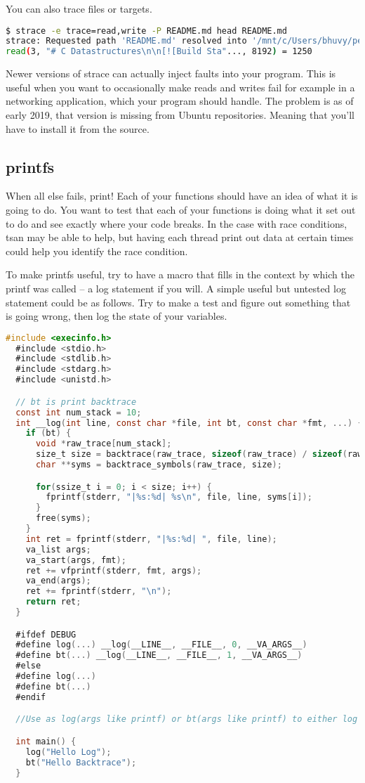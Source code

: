You can also trace files or targets.

\begin{lstlisting}[language=bash]
$ strace -e trace=read,write -P README.md head README.md
strace: Requested path 'README.md' resolved into '/mnt/c/Users/bhuvy/personal/libds/README.md'
read(3, "# C Datastructures\n\n[![Build Sta"..., 8192) = 1250

\end{lstlisting}

Newer versions of strace can actually inject faults into your program.
This is useful when you want to occasionally make reads and writes fail for example in a networking application, which your program should handle.
The problem is as of early 2019, that version is missing from Ubuntu repositories.
Meaning that you'll have to install it from the source.

\subsection{printfs}

When all else fails, print! Each of your functions should have an idea of what it is going to do.
You want to test that each of your functions is doing what it set out to do and see exactly where your code breaks.
In the case with race conditions, tsan may be able to help, but having each thread print out data at certain times could help you identify the race condition.

To make printfs useful, try to have a macro that fills in the context by which the printf was called -- a log statement if you will. A simple useful but untested log statement could be as follows.
Try to make a test and figure out something that is going wrong, then log the state of your variables.

\begin{lstlisting}[language=C]
  #include <execinfo.h>
  #include <stdio.h>
  #include <stdlib.h>
  #include <stdarg.h>
  #include <unistd.h>

  // bt is print backtrace
  const int num_stack = 10;
  int __log(int line, const char *file, int bt, const char *fmt, ...) {
    if (bt) {
      void *raw_trace[num_stack];
      size_t size = backtrace(raw_trace, sizeof(raw_trace) / sizeof(raw_trace[0]));
      char **syms = backtrace_symbols(raw_trace, size);

      for(ssize_t i = 0; i < size; i++) {
        fprintf(stderr, "|%s:%d| %s\n", file, line, syms[i]);
      }
      free(syms);
    }
    int ret = fprintf(stderr, "|%s:%d| ", file, line);
    va_list args;
    va_start(args, fmt);
    ret += vfprintf(stderr, fmt, args);
    va_end(args);
    ret += fprintf(stderr, "\n");
    return ret;
  }

  #ifdef DEBUG
  #define log(...) __log(__LINE__, __FILE__, 0, __VA_ARGS__)
  #define bt(...) __log(__LINE__, __FILE__, 1, __VA_ARGS__)
  #else
  #define log(...)
  #define bt(...)
  #endif

  //Use as log(args like printf) or bt(args like printf) to either log or get backtrace

  int main() {
    log("Hello Log");
    bt("Hello Backtrace");
  }
\end{lstlisting}

